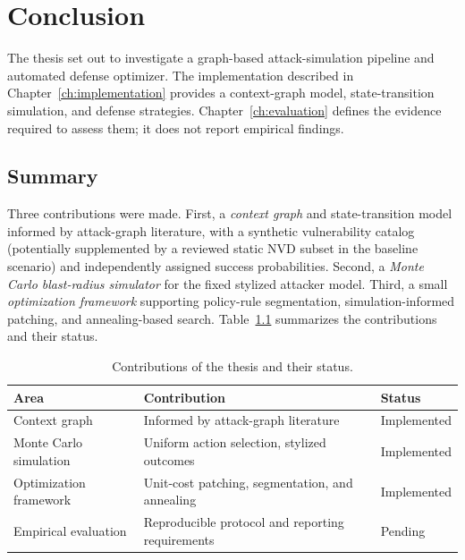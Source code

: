 \chapter{Conclusion}
\label{ch:conclusion}

The thesis set out to investigate a graph-based attack-simulation pipeline and automated defense optimizer. The implementation described in Chapter~\ref{ch:implementation} provides a context-graph model, state-transition simulation, and defense strategies. Chapter~\ref{ch:evaluation} defines the evidence required to assess them; it does not report empirical findings.

\section{Summary}
\label{ch:conclusion:summary}

Three contributions were made. First, a \emph{context graph} and state-transition model informed by attack-graph literature, with a synthetic vulnerability catalog (potentially supplemented by a reviewed static NVD subset in the baseline scenario) and independently assigned success probabilities. Second, a \emph{Monte Carlo blast-radius simulator} for the fixed stylized attacker model. Third, a small \emph{optimization framework} supporting policy-rule segmentation, simulation-informed patching, and annealing-based search. Table~\ref{tab:conclusion:contributions} summarizes the contributions and their status.

\begin{table}[hbt!]
	\centering
	\begin{tabular}{lll}
		\toprule
		\textbf{Area}             & \textbf{Contribution}                          & \textbf{Status}      \\
		\midrule
		Context graph             & Informed by attack-graph literature            & Implemented          \\
		Monte Carlo simulation    & Uniform action selection, stylized outcomes    & Implemented          \\
		Optimization framework    & Unit-cost patching, segmentation, and annealing & Implemented         \\
		Empirical evaluation      & Reproducible protocol and reporting requirements & Pending             \\
		\bottomrule
	\end{tabular}
	\caption{Contributions of the thesis and their status.}
	\label{tab:conclusion:contributions}
\end{table}


